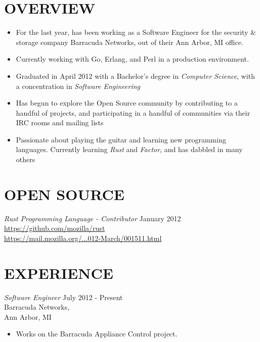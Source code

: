 \documentclass[line,margin]{res}
\begin{document}

\address{1450 Schafer Drive, Burton, MI 48509}
\address{pwoolcoc@gmail.com\ -\ (810) 412-8642}


\begin{resume}


\section{OVERVIEW}
    \begin{itemize}
        \item For the last year, has been working as a Software Engineer
              for the security \& storage company Barracuda Networks,
              out of their Ann Arbor, MI office.
        \item Currently working with Go, Erlang, and Perl in a production environment.
        \item Graduated in April 2012 with a Bachelor's degree in
              {\sl Computer Science}, with a concentration in
              {\sl Software Engineering}
        \item Has begun to explore the Open Source community by contributing to
              a handful of projects, and participating in a handful
              of communities via their IRC rooms and mailing lists
        \item Passionate about playing the guitar and learning new programming
              languages. Currently learning {\sl Rust} and {\sl Factor},
              and has dabbled in many others
    \end{itemize}



\section{OPEN SOURCE}
        {\sl Rust Programming Language - Contributor } \hfill January 2012 \\
              \href{https://github.com/mozilla/rust}{https://github.com/mozilla/rust} \\
              \href{https://mail.mozilla.org/pipermail/rust-dev/2012-March/001511.html}{https://mail.mozilla.org/...012-March/001511.html}

\section{EXPERIENCE}
    {\sl Software Engineer }
            \hfill July 2012 - Present \\
                    Barracuda Networks, \\
                    Ann Arbor, MI
        \begin{itemize}
            \item Works on the Barracuda Appliance Control project.
        \end{itemize}


\end{resume}
\end{document}
